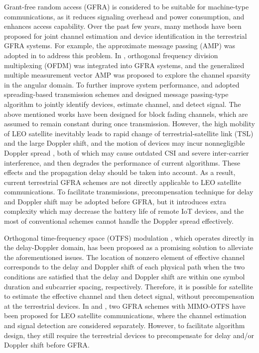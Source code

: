 \documentclass[conference]{IEEEtran}
\begin{document}
	Grant-free random access (GFRA) is considered to be suitable for machine-type communications, as it reduces signaling overhead and power consumption, and enhances access capability. Over the past few years, many methods have been proposed for joint channel estimation and device identification in the terrestrial GFRA systems. For example, the approximate message passing (AMP) was adopted in \cite{s33} to address this problem. In \cite{s43}, orthogonal
	frequency division multiplexing (OFDM) was integrated into GFRA systems, and the generalized multiple measurement vector AMP was proposed to explore the channel sparsity in the angular domain. To further improve system performance, \cite{Joint1} and \cite{Joint2} adopted spreading-based transmission schemes and designed message passing-type algorithm to jointly identify devices, estimate channel, and detect signal. The above mentioned works have been designed for block fading channels, which are assumed to remain constant during once transmission. However, the high mobility of LEO satellite inevitably leads to rapid change of terrestrial-satellite link (TSL) and the large Doppler shift, and the motion of devices may incur nonnegligible Doppler spread \cite{ss32}, both of which may cause outdated CSI and severe inter-carrier interference, and then degrades the performance of current algorithms. These effects and the propagation delay should be taken into account. As a result, current terrestrial GFRA schemes are not directly applicable to LEO satellite communications. To facilitate transmissions, precompensation technique \cite{cfocompen} for delay and Doppler shift may be adopted before GFRA, but it introduces extra complexity which may decrease the battery life of remote IoT devices, and the most of conventional schemes cannot handle the Doppler spread effectively.
	
	Orthogonal time-frequency space (OTFS) modulation \cite{s9},  which operates directly in the delay-Doppler domain, has been proposed as a promising solution to alleviate the aforementioned issues. The location of nonzero element of effective channel corresponds to the delay and Doppler shift of each physical path when the two conditions are satisfied that the delay and Doppler shift are within one symbol duration and subcarrier spacing, respectively. Therefore, it is possible for satellite to estimate the effective channel and then detect signal, without precompensation at the terrestrial devices.
	In \cite{smm1} and \cite{smm2}, two GFRA schemes with MIMO-OTFS have been proposed for LEO satellite communications, where the channel estimation and signal detection are considered separately. However, to facilitate algorithm design, they still require the terrestrial devices to precompensate for delay and/or Doppler shift before GFRA.
	
\end{document}
